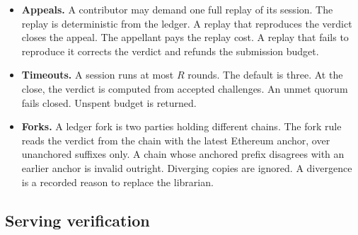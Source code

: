 \documentclass[11pt]{article}
\begin{document}
\begin{itemize}
          deposit and an evidence reference. The deposit is the registered
          reference-run price. It is deliberately bounded, so the dispute
          right is affordable to any contributor. The computation re-runs
          the frozen artifact on the challenged point inside a closed
          replay environment. The disputed input is reproduced only there.
          It never enters the public ledger. The outcome is deterministic.
          The losing party pays the full replay cost. An upheld dispute
          returns the deposit and slashes the wrong party. A rejected
          dispute burns the deposit.
    \item \textbf{Appeals.} A contributor may demand one full replay
          of its session. The replay is deterministic from the ledger. A
          replay that reproduces the verdict closes the appeal. The
          appellant pays the replay cost. A replay that fails to reproduce
          it corrects the verdict and refunds the submission budget.
    \item \textbf{Timeouts.} A session runs at most $R$ rounds. The
          default is three. At the close, the verdict is computed from
          accepted challenges. An unmet quorum fails closed. Unspent budget
          is returned.
    \item \textbf{Forks.} A ledger fork is two parties holding
          different chains. The fork rule reads the verdict from the chain
          with the latest Ethereum anchor, over unanchored suffixes only.
          A chain whose anchored prefix disagrees with an earlier anchor is
          invalid outright. Diverging copies are ignored. A divergence is a
          recorded reason to replace the librarian.
\end{itemize}

\subsection{Serving verification}\label{sec:serving}
\end{document}
